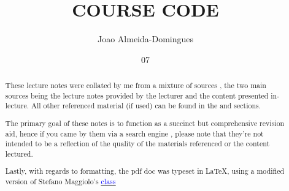 \documentclass[english,course]{Notes}
\title{COURSE CODE}
\author{Joao Almeida-Domingues}
\date{07}{07}{1993}
\begin{document}

\begin{abstract}
	\par{These lecture notes were collated by me from a mixture of sources , the two main sources being the lecture notes provided by the lecturer and the 
content presented in-lecture. All other referenced material (if used) can be found in the  and  sections.}
	\par{The primary goal of these notes is to function as a succinct but comprehensive revision aid, hence if you came by them via a search engine , please note 
that they're not intended to be a reflection of the quality of the materials referenced or the content lectured.}
	\par{Lastly, with regards to formatting, the pdf doc was typeset in \LaTeX , using a modified version of Stefano Maggiolo's \href{http://blog.poormansmath.net/
latex-class-for-lecture-notes/}{\underline{\textcolor{blue}{class}}}}
\end{abstract}
\newpage





\newpage
\nocite{*}
\printbibliography

\end{document}
